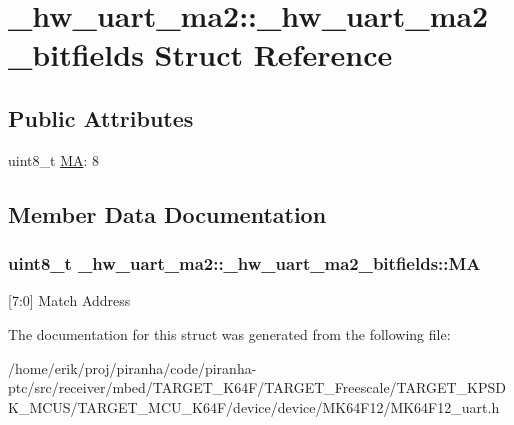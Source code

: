 \hypertarget{struct__hw__uart__ma2_1_1__hw__uart__ma2__bitfields}{}\section{\+\_\+hw\+\_\+uart\+\_\+ma2\+:\+:\+\_\+hw\+\_\+uart\+\_\+ma2\+\_\+bitfields Struct Reference}
\label{struct__hw__uart__ma2_1_1__hw__uart__ma2__bitfields}
\subsection*{Public Attributes}
\begin{DoxyCompactItemize}
\item 
uint8\+\_\+t \hyperlink{struct__hw__uart__ma2_1_1__hw__uart__ma2__bitfields_afa2b6654200f95076ac69efa32d4ce6f}{MA}\+: 8
\end{DoxyCompactItemize}


\subsection{Member Data Documentation}
\subsubsection[{\texorpdfstring{MA}{MA}}]{\setlength{\rightskip}{0pt plus 5cm}uint8\+\_\+t \+\_\+hw\+\_\+uart\+\_\+ma2\+::\+\_\+hw\+\_\+uart\+\_\+ma2\+\_\+bitfields\+::\+MA}\hypertarget{struct__hw__uart__ma2_1_1__hw__uart__ma2__bitfields_afa2b6654200f95076ac69efa32d4ce6f}{}\label{struct__hw__uart__ma2_1_1__hw__uart__ma2__bitfields_afa2b6654200f95076ac69efa32d4ce6f}
\mbox{[}7\+:0\mbox{]} Match Address 

The documentation for this struct was generated from the following file\+:\begin{DoxyCompactItemize}
\item 
/home/erik/proj/piranha/code/piranha-\/ptc/src/receiver/mbed/\+T\+A\+R\+G\+E\+T\+\_\+\+K64\+F/\+T\+A\+R\+G\+E\+T\+\_\+\+Freescale/\+T\+A\+R\+G\+E\+T\+\_\+\+K\+P\+S\+D\+K\+\_\+\+M\+C\+U\+S/\+T\+A\+R\+G\+E\+T\+\_\+\+M\+C\+U\+\_\+\+K64\+F/device/device/\+M\+K64\+F12/M\+K64\+F12\+\_\+uart.\+h\end{DoxyCompactItemize}
